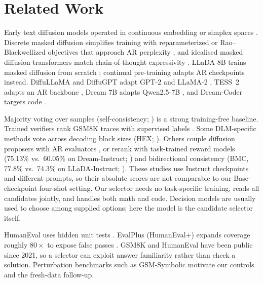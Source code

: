 \section{Related Work}
\label{sec:related-work}

Early text diffusion models operated in continuous embedding or simplex spaces \cite{li2022diffusionlm,han2023ssdlm}. Discrete masked diffusion simplifies training with reparameterized or Rao--Blackwellized objectives that approach AR perplexity \cite{zheng2023reparam,sahoo2024mdlm}, and idealised masked diffusion transformers match chain-of-thought expressivity \cite{svete2025reasoning}. LLaDA 8B trains masked diffusion from scratch \cite{nie2025llada}; continual pre-training \cite{ke2023continual} adapts AR checkpoints instead. DiffuLLaMA and DiffuGPT adapt GPT-2 and LLaMA-2 \cite{gong2025diffullama}, TESS~2 adapts an AR backbone \cite{tae2025tess2}, Dream 7B adapts Qwen2.5-7B \cite{ye2025dream7b}, and Dream-Coder targets code \cite{xie2025dreamcoder}.

Majority voting over samples (self-consistency; \cite{wang2023selfconsistency}) is a strong training-free baseline. Trained verifiers rank GSM8K traces with supervised labels \cite{cobbe2021gsm8k}. Some DLM-specific methods vote across decoding block sizes (HEX; \cite{lee2025hex}). Others couple diffusion proposers with AR evaluators \cite{shao2025diffusethinking,berrayana2025planner}, or rerank with task-trained reward models (75.13\% vs.\ 60.05\% on Dream-Instruct; \cite{zhan2026prm}) and bidirectional consistency (BMC, 77.8\% vs.\ 74.3\% on LLaDA-Instruct; \cite{ruan2026bmc}). These studies use Instruct checkpoints and different prompts, so their absolute scores are not comparable to our Base-checkpoint four-shot setting. Our selector needs no task-specific training, reads all candidates jointly, and handles both math and code. Decision models are usually used to choose among supplied options; here the model is the candidate selector itself.

HumanEval uses hidden unit tests \cite{chen2021humaneval}. EvalPlus (HumanEval+) expands coverage roughly $80\times$ to expose false passes \cite{liu2023evalplus}. GSM8K and HumanEval have been public since 2021, so a selector can exploit answer familiarity rather than check a solution. Perturbation benchmarks such as GSM-Symbolic \cite{mirzadeh2024gsmsymbolic} motivate our controls and the fresh-data follow-up.
